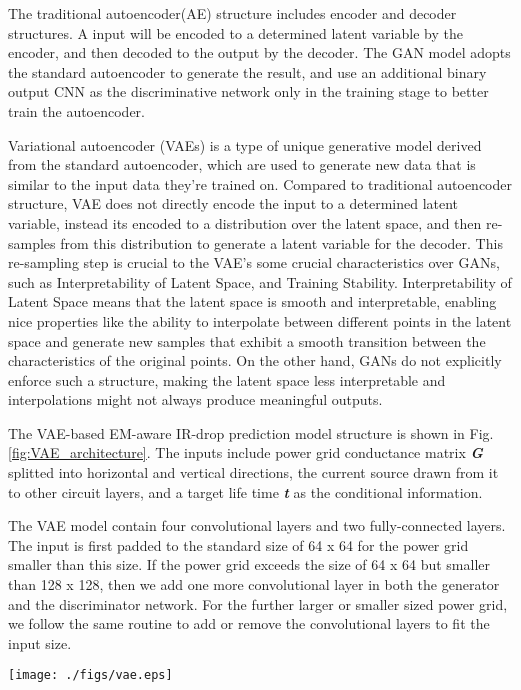The traditional autoencoder(AE) structure includes encoder and decoder structures. A input will be encoded to a determined latent variable by the encoder, and then decoded to the output by the decoder.  The GAN model adopts the standard autoencoder to generate the result, and use an additional binary output CNN as the discriminative network only in the training stage to better train the autoencoder. 
 
Variational autoencoder (VAEs) is a type of unique generative model derived from the standard autoencoder, which are used to generate new data that is similar to the input data they're trained on. 
Compared to traditional autoencoder structure, VAE does not directly encode the input to a determined latent variable, instead its encoded to a distribution over the latent space,  and then re-samples from this distribution to generate a latent variable for the decoder. This re-sampling step is crucial to the VAE's some crucial characteristics over GANs, such as Interpretability of Latent Space, and Training Stability.
Interpretability of Latent Space means that the latent space is smooth and interpretable, enabling nice properties like the ability to interpolate between different points in the latent space and generate new samples that exhibit a smooth transition between the characteristics of the original points. On the other hand, GANs do not explicitly enforce such a structure, making the latent space less interpretable and interpolations might not always produce meaningful outputs. 

The VAE-based EM-aware IR-drop prediction model structure is shown in Fig.\ref{fig:VAE_architecture}. The inputs include power grid conductance matrix \textit{\textbf{G}} splitted into horizontal and vertical directions, the current source drawn from it to other circuit layers, and a target life time \textit{\textbf{t}} as the conditional information. 
 
The VAE model contain four convolutional layers and two fully-connected layers. The input is first padded to the standard size of 64 x 64 for the power grid smaller than this size. If the power grid exceeds the size of 64 x 64 but smaller than 128 x 128, then we add one more convolutional layer in both the generator and the discriminator network. For the further larger or smaller sized power grid, we follow the same routine to add or remove the convolutional layers to fit the input size.
\begin{figure*}[h!]
	\centering
	\texttt{[image: ./figs/vae.eps]}
	\caption{VAE-based EM-aware IR drop prediction model} 
	\label{fig:VAE_architecture}
\end{figure*}

